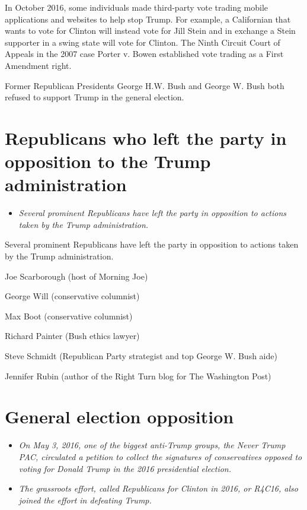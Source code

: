 In October 2016, some individuals made third-party vote trading mobile
applications and websites to help stop Trump. For example, a Californian
that wants to vote for Clinton will instead vote for Jill Stein and in
exchange a Stein supporter in a swing state will vote for Clinton. The
Ninth Circuit Court of Appeals in the 2007 case Porter v. Bowen
established vote trading as a First Amendment right.

Former Republican Presidents George H.W. Bush and George W. Bush both
refused to support Trump in the general election.

\section{Republicans who left the party in opposition to the Trump
administration}\label{republicans-who-left-the-party-in-opposition-to-the-trump-administration}

\begin{itemize}
\item
  \emph{Several prominent Republicans have left the party in opposition
  to actions taken by the Trump administration.}
\end{itemize}

Several prominent Republicans have left the party in opposition to
actions taken by the Trump administration.

Joe Scarborough (host of Morning Joe)

George Will (conservative columnist)

Max Boot (conservative columnist)

Richard Painter (Bush ethics lawyer)

Steve Schmidt (Republican Party strategist and top George W. Bush aide)

Jennifer Rubin (author of the Right Turn blog for The Washington Post)

\section{General election opposition}\label{general-election-opposition}

\begin{itemize}
\item
  \emph{On May 3, 2016, one of the biggest anti-Trump groups, the Never
  Trump PAC, circulated a petition to collect the signatures of
  conservatives opposed to voting for Donald Trump in the 2016
  presidential election.}
\item
  \emph{The grassroots effort, called Republicans for Clinton in 2016,
  or R4C16, also joined the effort in defeating Trump.}
\end{itemize}

